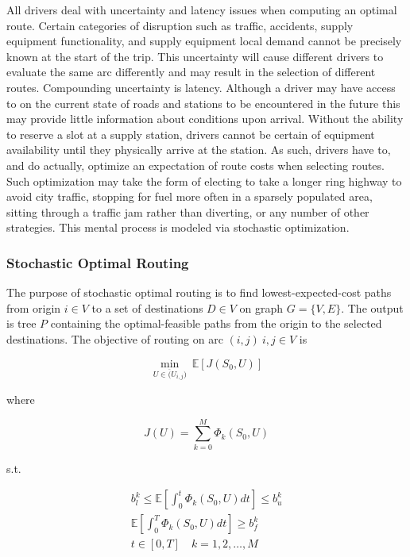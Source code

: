 All drivers deal with uncertainty and latency issues when computing an optimal route. Certain categories of disruption such as traffic, accidents, supply equipment functionality, and supply equipment local demand cannot be precisely known at the start of the trip. This uncertainty will cause different drivers to evaluate the same arc differently and may result in the selection of different routes. Compounding uncertainty is latency. Although a driver may have access to on the current state of roads and stations to be encountered in the future this may provide little information about conditions upon arrival. Without the ability to reserve a slot at a supply station, drivers cannot be certain of equipment availability until they physically arrive at the station. As such, drivers have to, and do actually, optimize an expectation of route costs when selecting routes. Such optimization may take the form of electing to take a longer ring highway to avoid city traffic, stopping for fuel more often in a sparsely populated area, sitting through a traffic jam rather than diverting, or any number of other strategies. This mental process is modeled via stochastic optimization.

\subsubsection*{Stochastic Optimal Routing}

The purpose of stochastic optimal routing is to find lowest-expected-cost paths from origin $i \in V$ to a set of destinations $D \in V$ on graph $G = \{V, E\}$. The output is tree $P$ containing the optimal-feasible paths from the origin to the selected destinations. The objective of routing on arc $(i,j)\ i, j \in V$ is

\begin{equation}
	\min_{U \in \overline({U}_{i,j})}\ \mathbb{E}[J(S_0, U)]
\end{equation}

where

\begin{equation}
	J(U) = \sum_{k = 0}^M \Phi_k(S_0, U)
\end{equation}

s.t.

\begin{gather}	
	b^k_l \leq \mathbb{E}\left[\int_0^t \Phi_k(S_0, U)dt\right] \leq b^k_u\\
	\mathbb{E}\left[\int_0^T \Phi_k(S_0, U)dt\right] \geq b^k_f\\
	t \in [0, T]\quad k = 1, 2, \dots, M
\end{gather}

